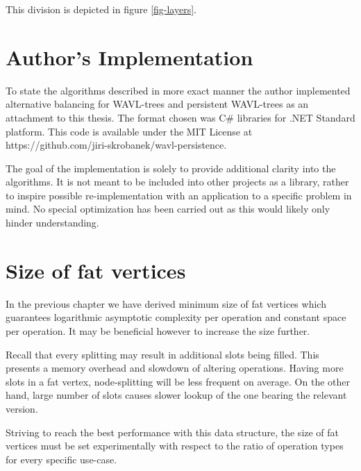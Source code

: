 This division is depicted in figure \ref{fig-layers}.



\section{Author's Implementation}

To state the algorithms described in more exact manner the author implemented alternative balancing for WAVL-trees and persistent WAVL-trees as an attachment to this thesis. 
The format chosen was C\# libraries for .NET Standard platform. 
This code is available under the MIT License at\newline
{\ttfamily https://github.com/jiri-skrobanek/wavl-persistence}.

The goal of the implementation is solely to provide additional clarity into the algorithms. 
It is not meant to be included into other projects as a library, rather to inspire possible re-implementation with an application to a specific problem in mind.
No special optimization has been carried out as this would likely only hinder understanding. 

\section{Size of fat vertices}

In the previous chapter we have derived minimum size of fat vertices which guarantees logarithmic asymptotic complexity per operation and constant space per operation. 
It may be beneficial however to increase the size further.

Recall that every splitting may result in additional slots being filled. 
This presents a memory overhead and slowdown of altering operations. 
Having more slots in a fat vertex, node-splitting will be less frequent on average. 
On the other hand, large number of slots causes slower lookup of the one bearing the relevant version. 

Striving to reach the best performance with this data structure, the size of fat vertices must be set experimentally with respect to the ratio of operation types for every specific use-case.